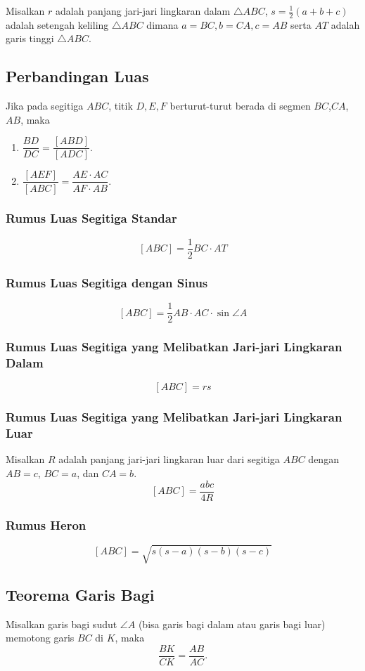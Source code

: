 Misalkan $r$ adalah panjang jari-jari lingkaran dalam $\triangle ABC$, $s=\frac{1}{2}(a+b+c)$ adalah setengah keliling $\triangle ABC$ dimana $a=BC, b=CA, c=AB$ serta $AT$ adalah garis tinggi $\triangle ABC$.

\subsection{Perbandingan Luas}
Jika pada segitiga $ABC$, titik $D,E,F$ berturut-turut berada di segmen $BC$,$CA$,$AB$, maka 
\begin{enumerate}
    \item $\dfrac{BD}{DC} = \dfrac{[ABD]}{[ADC]}.$
    \item $\dfrac{[AEF]}{[ABC]}=\dfrac{AE \cdot AC}{AF \cdot AB}.$
\end{enumerate}
\subsubsection{Rumus Luas Segitiga Standar}
$$[ABC]  = \dfrac{1}{2}BC \cdot AT$$
\subsubsection{Rumus Luas Segitiga dengan Sinus}
$$[ABC]  = \dfrac{1}{2}AB\cdot AC \cdot \sin \angle A$$
\subsubsection{Rumus Luas Segitiga yang Melibatkan Jari-jari Lingkaran Dalam}
$$[ABC]  =  rs$$
\subsubsection{Rumus Luas Segitiga yang Melibatkan Jari-jari Lingkaran Luar}
Misalkan $R$ adalah panjang jari-jari lingkaran luar dari segitiga $ABC$ dengan $AB=c$, $BC=a$, dan $CA=b$.
$$[ABC]  =  \dfrac{abc}{4R}$$
\subsubsection{Rumus Heron}
$$[ABC]  = \sqrt{s(s-a)(s-b)(s-c)}$$

\subsection{Teorema Garis Bagi}
Misalkan garis bagi sudut $\angle A$ (bisa garis bagi dalam atau garis bagi luar) memotong garis $BC$ di $K$, maka 
$$\dfrac{BK}{CK} = \dfrac{AB}{AC}.$$
\begin{center}
\end{center}

